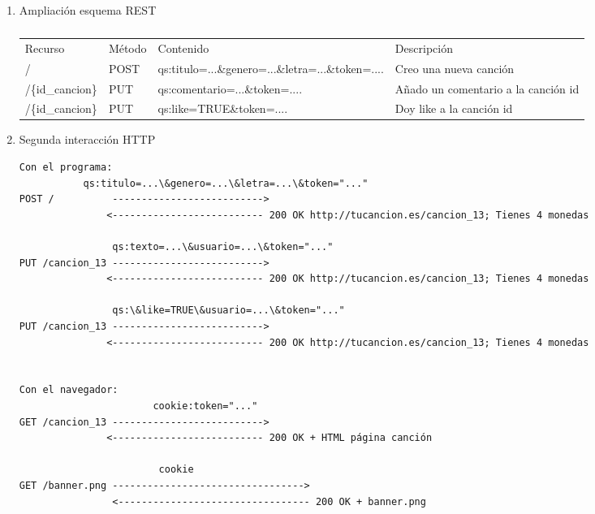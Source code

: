 \begin{enumerate}
\item Ampliación esquema REST

\begin{table}[h!]
\begin{tabular}{llll}
Recurso                & Método & Contenido                                            & Descripción                           \\
/                      & POST   & qs:titulo=...\&genero=...\&letra=...\&token=.... & Creo una nueva canción                \\
/\{id\_cancion\}       & PUT   & qs:comentario=...\&token=....      & Añado un comentario a la canción id   \\
/\{id\_cancion\}       & PUT   & qs:like=TRUE\&token=....           & Doy like a la canción id              \\
\end{tabular}
\caption{}
\label{tab:my-table2}
\end{table}

\item Segunda interacción HTTP

\begin{verbatim}
Con el programa:
           qs:titulo=...\&genero=...\&letra=...\&token="..."
POST /          -------------------------->
               <-------------------------- 200 OK http://tucancion.es/cancion_13; Tienes 4 monedas

                qs:texto=...\&usuario=...\&token="..."
PUT /cancion_13 -------------------------->
               <-------------------------- 200 OK http://tucancion.es/cancion_13; Tienes 4 monedas

                qs:\&like=TRUE\&usuario=...\&token="..."
PUT /cancion_13 -------------------------->
               <-------------------------- 200 OK http://tucancion.es/cancion_13; Tienes 4 monedas


Con el navegador:
                       cookie:token="..."
GET /cancion_13 -------------------------->
               <-------------------------- 200 OK + HTML página canción

                        cookie
GET /banner.png --------------------------------->
                <--------------------------------- 200 OK + banner.png

\end{verbatim}

\end{enumerate}

